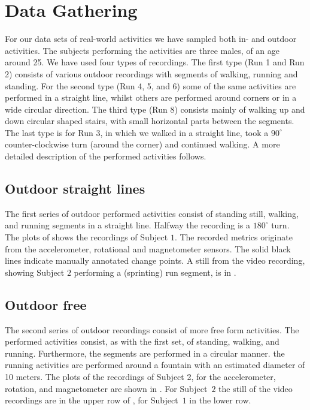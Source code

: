 \section{Data Gathering}\label{sec:data_gathering}
For our data sets of real-world activities we have sampled both in- and outdoor activities.
The subjects performing the activities are three males, of an age around 25.
We have used four types of recordings.
The first type (Run 1 and Run 2) consists of various outdoor recordings with segments of walking, running and standing.
For the second type (Run 4, 5, and 6) some of the same activities are performed in a straight line, whilst others are performed around corners or in a wide circular direction.
The third type (Run 8) consists mainly of walking up and down circular shaped stairs, with small horizontal parts between the segments.
The last type is for Run 3, in which we walked in a straight line, took a $90^{\circ}$ counter-clockwise turn (around the corner) and continued walking.
A more detailed description of the performed activities follows.

\subsection{Outdoor straight lines}\label{subsec:outdoor_straight}
The first series of outdoor performed activities consist of standing still, walking, and running segments in a straight line.
Halfway the recording is a $180^{\circ}$ turn.
The plots of  shows the recordings of Subject $1$.
The recorded metrics originate from the accelerometer, rotational and magnetometer sensors.
The solid black lines indicate manually annotated change points.
A still from the video recording, showing Subject $2$ performing a (sprinting) run segment, is in .

\subsection{Outdoor free}\label{subsec:outdoor_free}
The second series of outdoor recordings consist of more free form activities.
The performed activities consist, as with the first set, of standing, walking, and running.
Furthermore, the segments are performed in a circular manner.
\eg the running activities are performed around a fountain with an estimated diameter of 10 meters.
The plots of the recordings of Subject 2, for the accelerometer, rotation, and magnetometer are shown in .
For Subject~$2$ the still of the video recordings are in the upper row of , for Subject~$1$ in the lower row.

